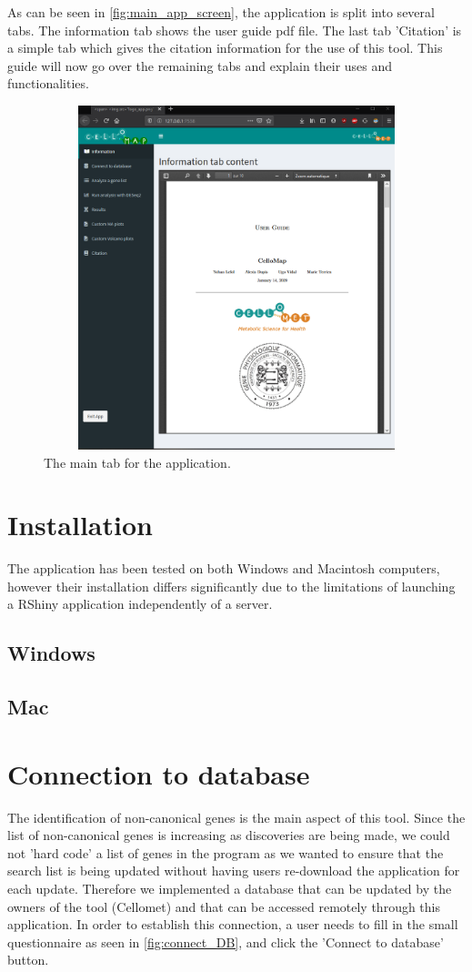 \documentclass[11pt]{article}
\begin{document}
As can be seen in \autoref{fig:main_app_screen}, the application is split into several tabs. The information tab shows the user guide pdf file. The last tab 'Citation' is a simple tab which gives the citation information for the use of this tool. This guide will now go over the remaining tabs and explain their uses and functionalities.
\begin{figure}[h!]
\centering
\includegraphics[width=15cm,height=10cm,keepaspectratio]{main_app_screen.png}
\caption{The main tab for the application.}
\label{fig:main_app_screen}
\end{figure}

\section{Installation}
The application has been tested on both Windows and Macintosh computers, however their installation differs significantly due to the limitations of launching a RShiny application independently of a server.
\subsection{Windows}


\subsection{Mac}

\section{Connection to database}
The identification of non-canonical genes is the main aspect of this tool. Since the list of non-canonical genes is increasing as discoveries are being made, we could not 'hard code' a list of genes in the program as we wanted to ensure that the search list is being updated without having users re-download the application for each update. Therefore we implemented a database that can be updated by the owners of the tool (Cellomet) and that can be accessed remotely through this application.
In order to establish this connection, a user needs to fill in the small questionnaire as seen in \autoref{fig:connect_DB}, and click the 'Connect to database' button.
\end{document}
